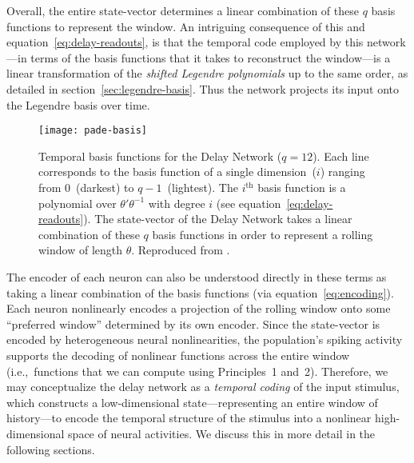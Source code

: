 Overall, the entire state-vector determines a linear combination of these $q$ basis functions to represent the window.
An intriguing consequence of this and equation~\ref{eq:delay-readouts}, is that the temporal code employed by this network---in terms of the basis functions that it takes to reconstruct the window---is a linear transformation of the \emph{shifted Legendre polynomials} up to the same order, as detailed in section~\ref{sec:legendre-basis}.
Thus the network projects its input onto the Legendre basis over time.

\begin{figure}
  \centering
  \texttt{[image: pade-basis]}
  \caption[Temporal representation of the Delay Network.]{ \label{fig:basis-functions}
    Temporal basis functions for the Delay Network ($q = 12$).
    Each line corresponds to the basis function of a single dimension~($i$) ranging from $0$~(darkest) to $q - 1$~(lightest).
    The $i^\text{th}$ basis function is a polynomial over $\theta' \theta^{-1}$ with degree $i$ (see equation~\ref{eq:delay-readouts}). %
    The state-vector of the Delay Network takes a linear combination of these $q$ basis functions in order to represent a rolling window of length $\theta$.
    Reproduced from \citet[][Figure~5]{voelker2018}.
  }
\end{figure}

The encoder of each neuron can also be understood directly in these terms as taking a linear combination of the basis functions (via equation~\ref{eq:encoding}).
Each neuron nonlinearly encodes a projection of the rolling window onto some ``preferred window'' determined by its own encoder.
Since the state-vector is encoded by heterogeneous neural nonlinearities, the population's spiking activity supports the decoding of nonlinear functions across the entire window (i.e.,~functions that we can compute using Principles~1 and~2).
Therefore, we may conceptualize the delay network as a \emph{temporal coding} of the input stimulus, which constructs a low-dimensional state---representing an entire window of history---to encode the temporal structure of the stimulus into a nonlinear high-dimensional space of neural activities.
We discuss this in more detail in the following sections.

